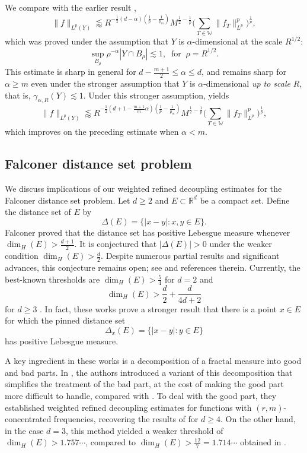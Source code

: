 \documentclass[11pt]{amsart}
\theoremstyle{definition}
\theoremstyle{remark}
\numberwithin{equation}{section}
\newcommand{\R}{\mathbb{R}}
\newcommand{\W}{\mathbb{W}}
\newcommand{\les}{\lesssim}
\newcommand{\less}{\lessapprox}
\begin{document}
We compare  with the earlier result \cite[Theorem 1.2(b)]{du2023weighted},
\[ 
	\| f \|_{L^p(Y)} \less R^{-\frac{1}{2} (d-\alpha)(\frac{1}{p}-\frac{1}{p_m})} 
	M^{\frac{1}{2}-\frac{1}{p}}   \bigg( \sum_{T\in \W} \| f_T \|_{L^p}^p \bigg)^{\frac{1}{p}},
\]
which was proved under the assumption that $Y$ is $\alpha$-dimensional at the scale $R^{1/2}$:  \[ \sup_{B_\rho} \rho^{-\alpha} |Y\cap B_\rho| \les 1, \;\;  \text{for} \;\;  \rho = R^{1/2}.\] 
This estimate is sharp in general for $d-\frac{m+1}{2}\leq\alpha\leq d$, and remains sharp for $\alpha\geq m$ even under the stronger assumption that $Y$ is $\alpha$-dimensional \emph{up to scale} $R$, that is, $ \gamma_{\alpha,R}(Y) \les 1$.   Under this stronger assumption,  yields 
\[ 
			\| f \|_{L^p(Y)} \less R^{-\frac{1}{2} ( d+1 -  \frac{m+1}{m} \alpha)(\frac{1}{p}-\frac{1}{p_m})} 
			M^{\frac{1}{2}-\frac{1}{p}}   \bigg( \sum_{T\in \W} \| f_T \|_{L^p}^p \bigg)^{\frac{1}{p}},
\]
which improves on  the preceding estimate when $\alpha < m$. 
	
\subsection*{Falconer distance set problem}
We discuss  implications of our weighted refined decoupling estimates for the Falconer distance set problem. Let $d\geq 2$ and $E\subset \R^d$ be a compact set. Define the distance set of $E$ by
\[\Delta(E) = \{ |x-y|: x,y\in E\}. \]
Falconer \cite{falconer_1985} proved that the distance set has positive Lebesgue measure whenever $\dim_H(E)>\frac{d+1}{2}$. It is conjectured that $|\Delta(E)|>0$ under the weaker condition $\dim_H(E)>\frac{d}{2}$. Despite numerous partial results and significant advances, this conjecture remains open; see \cite{GIOW, du2023Falconer} and references therein. Currently, the best-known thresholds are $\dim_H(E)>\frac{5}{4}$ for $d=2$ \cite{GIOW} and  
\[ \dim_H(E)>\frac{d}{2}+\frac{d}{4d+2}\] 
for $d\geq 3$ \cite{du2023Falconer}. In fact, these works prove a stronger result that there is a point $x \in E$ for which the pinned distance set 
\[ \Delta_x(E) = \{ |x-y| : y \in E \}\] has positive Lebesgue measure. 

A key ingredient in these works is a decomposition of a fractal measure into good and bad parts. In \cite{du2023weighted}, the authors introduced a variant of this decomposition that simplifies the treatment of the bad part, at the cost of making the good part more difficult to handle, compared with \cite{du2023Falconer}. To deal with the good part,  they established weighted refined decoupling estimates for functions with $(r,m)$-concentrated frequencies, recovering the results of \cite{du2023Falconer} for $d\geq 4$. On the other hand, in the case $d=3$, this method yielded a weaker threshold of $\dim_H(E)> 1.757\cdots$, compared to $\dim_H(E) > \frac{12}{7}=1.714\cdots$ obtained in \cite{du2023Falconer}.
\end{document}
